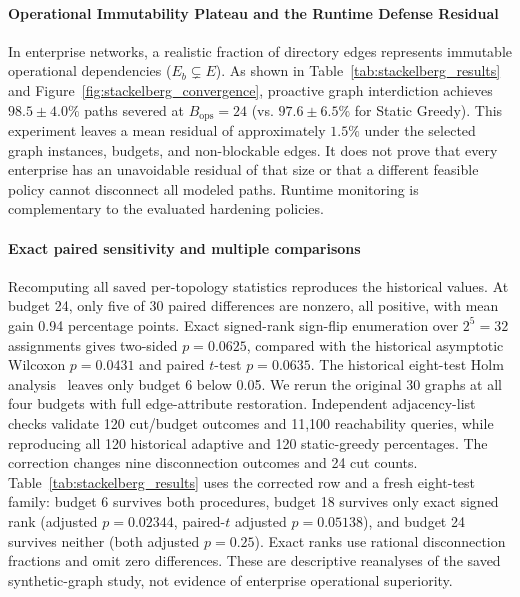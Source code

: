 \paragraph{Operational Immutability Plateau and the Runtime Defense Residual}
In enterprise networks, a realistic fraction of directory edges represents immutable operational dependencies ($E_b \subsetneq E$). As shown in Table~\ref{tab:stackelberg_results} and Figure~\ref{fig:stackelberg_convergence}, proactive graph interdiction achieves \textbf{$98.5 \pm 4.0\%$} paths severed at $B_{\text{ops}}=24$ (vs. $97.6 \pm 6.5\%$ for Static Greedy).
This experiment leaves a mean residual of approximately $1.5\%$ under the selected graph instances, budgets, and non-blockable edges. It does not prove that every enterprise has an unavoidable residual of that size or that a different feasible policy cannot disconnect all modeled paths. Runtime monitoring is complementary to the evaluated hardening policies.

\paragraph{Exact paired sensitivity and multiple comparisons}
Recomputing all saved per-topology statistics reproduces the historical values. At budget 24, only five of 30 paired differences are nonzero, all positive, with mean gain 0.94 percentage points. Exact signed-rank sign-flip enumeration over $2^5=32$ assignments gives two-sided $p=0.0625$, compared with the historical asymptotic Wilcoxon $p=0.0431$ and paired $t$-test $p=0.0635$. The historical eight-test Holm analysis~\cite{holm1979simple} leaves only budget 6 below 0.05. We rerun the original 30 graphs at all four budgets with full edge-attribute restoration. Independent adjacency-list checks validate 120 cut/budget outcomes and 11,100 reachability queries, while reproducing all 120 historical adaptive and 120 static-greedy percentages. The correction changes nine disconnection outcomes and 24 cut counts. Table~\ref{tab:stackelberg_results} uses the corrected row and a fresh eight-test family: budget 6 survives both procedures, budget 18 survives only exact signed rank (adjusted $p=0.02344$, paired-$t$ adjusted $p=0.05138$), and budget 24 survives neither (both adjusted $p=0.25$). Exact ranks use rational disconnection fractions and omit zero differences. These are descriptive reanalyses of the saved synthetic-graph study, not evidence of enterprise operational superiority.

